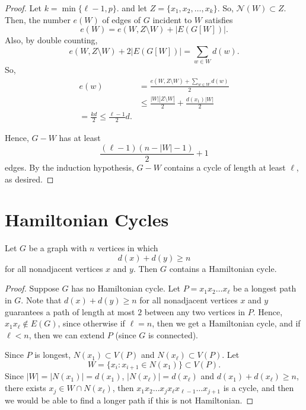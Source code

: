\begin{proof}
    Let \(k = \min\{\ell - 1, p\}\).
    and let \(Z = \{x_1, x_2, \dots, x_k\}\).
    So, \(\mathcal{N}(W) \subset Z\).
    Then, the number \(e(W)\) of edges of \(G\) incident to \(W\)
    satisfies 
    \begin{equation}
        e(W) = e(W, Z \setminus W) + |E(G[W])|.
    \end{equation}
    Also, by double counting,
    \begin{equation}
        e(W, Z \setminus W) + 2|E(G[W])| = \sum_{w \in W} d(w).
    \end{equation}
    So,
    \begin{align}
        e(w) &= \frac{e(W, Z \setminus W) + \sum_{w \in W} d(w)}{2} \\
             &\leq \frac{|W| |Z \setminus W|}{2} + \frac{d(x_1)|W|}{2} \\
             = \frac{kd}{2} \leq \frac{\ell-1}{2} d.
    \end{align}

    Hence, \(G - W\) has at least 
    \begin{equation}
        \frac{(\ell - 1)(n-|W|-1)}{2} + 1
    \end{equation}
    edges.
    By the induction hypothesis,
    \(G - W\) contains a cycle of length at least \(\ell\),
    as desired.
\end{proof}

\section{Hamiltonian Cycles}

\begin{theorem}
    Let \(G\) be a graph with \(n\) vertices
    in which
    \begin{equation}
        d(x) + d(y) \geq n
    \end{equation}
    for all nonadjacent vertices \(x\) and \(y\).
    Then \(G\) contains a Hamiltonian cycle.
\end{theorem}

\begin{proof}
    Suppose \(G\) has no Hamiltonian cycle.
    Let \(P = x_1x_2 \ldots x_\ell\) be a longest path in \(G\).
    Note that \(d(x) + d(y) \geq n\) for all nonadjacent vertices \(x\) and \(y\)
    guarantees a path of length at most \(2\) between any two vertices in \(P\).
    Hence, \(x_1x_\ell \not\in E(G)\), since otherwise if \(\ell = n\),
    then we get a Hamiltonian cycle, and if \(\ell < n\), then we can extend \(P\)
    (since \(G\) is connected).

    Since \(P\) is longest, \(N(x_1) \subset V(P)\) and \(N(x_\ell) \subset V(P)\).
    Let 
    \begin{equation}
        W = \{x_i : x_{i+1} \in N(x_1)\} \subset V(P).
    \end{equation}
    Since \(|W| = |N(x_1)| = d(x_1)\), \(|N(x_\ell)| = d(x_\ell)\) and \(d(x_1) + d(x_\ell) \geq n\),
    there exists \(x_j \in W \cap N(x_\ell)\), then \(x_1x_2 \ldots x_j x_\ell x_{\ell-1} \ldots x_{j+1}\) is a cycle,
    and then we would be able to find a longer path if this is not Hamiltonian.
\end{proof}

